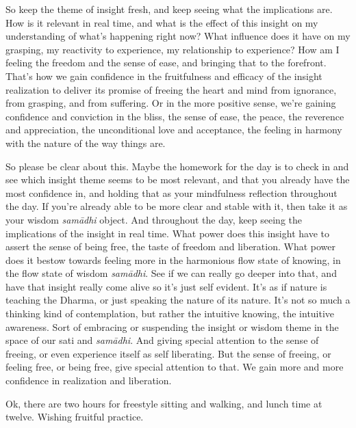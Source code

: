 \documentclass[12pt,openany]{book}
\begin{document}
So keep the theme of insight fresh, and keep seeing what the implications are. How is it relevant in real time, and what is the effect of this insight on my understanding of what’s happening right now? What influence does it have on my grasping, my reactivity to experience, my relationship to experience? How am I feeling the freedom and the sense of ease, and bringing that to the forefront. That's how we gain confidence in the fruitfulness and efficacy of the insight realization to deliver its promise of freeing the heart and mind from ignorance, from grasping, and from suffering. Or in the more positive sense, we're gaining confidence and conviction in the bliss, the sense of ease, the peace, the reverence and appreciation, the unconditional love and acceptance, the feeling in harmony with the nature of the way things are.

So please be clear about this. Maybe the homework for the day is to check in and see which insight theme seems to be most relevant, and that you already have the most confidence in, and holding that as your mindfulness reflection throughout the day. If you’re already able to be more clear and stable with it, then take it as your wisdom \textit{samādhi} object. And throughout the day, keep seeing the implications of the insight in real time. What power does this insight have to assert the sense of being free, the taste of freedom and liberation. What power does it bestow towards feeling more in the harmonious flow state of knowing, in the flow state of wisdom \textit{samādhi}. See if we can really go deeper into that, and have that insight really come alive so it's just self evident. It’s as if nature is teaching the Dharma, or just speaking the nature of its nature. It’s not so much a thinking kind of contemplation, but rather the intuitive knowing, the intuitive awareness. Sort of embracing or suspending the insight or wisdom theme in the space of our sati and \textit{samādhi}. And giving special attention to the sense of freeing, or even experience itself as self liberating. But the sense of freeing, or feeling free, or being free, give special attention to that. We gain more and more confidence in realization and liberation. 

Ok, there are two hours for freestyle sitting and walking, and \linebreak lunch time at twelve. Wishing fruitful practice. 

\medskip
\end{document}
